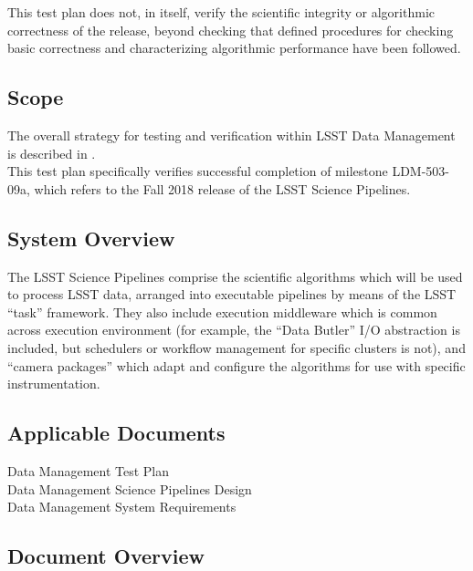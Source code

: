 \documentclass[DM,STR,toc]{lsstdoc}
\begin{document}
This test plan does not, in itself, verify the scientific integrity or
algorithmic correctness of the release, beyond checking that defined
procedures for checking basic correctness and characterizing algorithmic
performance have been followed.\\[2\baselineskip]

\subsection{Scope}\label{scope}

The overall strategy for testing and verification within LSST Data
Management is described in .\\
This test plan specifically verifies successful completion of milestone
LDM-503-09a, which refers to the Fall 2018 release of the LSST Science
Pipelines.



\subsection{System Overview}
\label{sect:systemoverview}

The LSST Science Pipelines comprise the scientific algorithms which will
be used to process LSST data, arranged into executable pipelines by
means of the LSST ``task'' framework. They also include execution
middleware which is common across execution environment (for example,
the ``Data Butler'' I/O abstraction is included, but schedulers or
workflow management for specific clusters is not), and ``camera
packages'' which adapt and configure the algorithms for use with
specific instrumentation.\\[2\baselineskip]

\subsection{\texorpdfstring{Applicable Documents\\
}{Applicable Documents }}\label{applicable-documents}

 Data Management Test Plan\\
 Data Management Science Pipelines Design\\
 Data Management System Requirements


\subsection{Document Overview}
\label{sect:docoverview}
\end{document}
